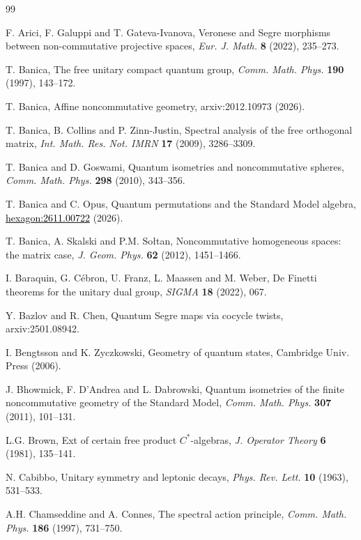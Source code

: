 \documentclass[11pt]{article}
\theoremstyle{plain}
\begin{document}
\begin{thebibliography}{99}
\setlength{\itemsep}{1pt}
\setlength{\parsep}{0pt}
\raggedright

F. Arici, F. Galuppi and T. Gateva-Ivanova, Veronese and Segre morphisms between non-commutative projective spaces, {\em Eur. J. Math.} {\bf 8} (2022), 235--273.

T. Banica, The free unitary compact quantum group, {\em Comm. Math. Phys.} {\bf 190} (1997), 143--172.

T. Banica, Affine noncommutative geometry, {\color{black}arxiv:2012.10973} (2026).

T. Banica, B. Collins and P. Zinn-Justin, Spectral analysis of the free orthogonal matrix, {\em Int. Math. Res. Not. IMRN} {\bf 17} (2009), 3286--3309.

T. Banica and D. Goswami, Quantum isometries and noncommutative spheres, {\em Comm. Math. Phys.} {\bf 298} (2010), 343--356.

T. Banica and C. Opus, Quantum permutations and the Standard Model algebra, \href{https://hexagonmath.org/2611.00722v1}{\textcolor{black}{\mbox{hexagon:2611.00722}}} (2026).

T. Banica, A. Skalski and P.M. So\l tan, Noncommutative homogeneous spaces: the matrix case, {\em J. Geom. Phys.} {\bf 62} (2012), 1451--1466.

I. Baraquin, G. C\'ebron, U. Franz, L. Maassen and M. Weber, De Finetti theorems for the unitary dual group, {\em SIGMA} {\bf 18} (2022), 067.

Y. Bazlov and R. Chen, Quantum Segre maps via cocycle twists, {\color{black}arxiv:2501.08942}.

I. Bengtsson and K. Zyczkowski, Geometry of quantum states, Cambridge Univ. Press (2006).

J. Bhowmick, F. D'Andrea and L. Dabrowski, Quantum isometries of the finite noncommutative geometry of the Standard Model, {\em Comm. Math. Phys.} {\bf 307} (2011), 101--131.

L.G. Brown, Ext of certain free product $C^*$-algebras, {\em J. Operator Theory} {\bf 6} (1981), 135--141.

N. Cabibbo, Unitary symmetry and leptonic decays, {\em Phys. Rev. Lett.} {\bf 10} (1963), 531--533.

A.H. Chamseddine and A. Connes, The spectral action principle, {\em Comm. Math. Phys.} {\bf 186} (1997), 731--750.


\end{thebibliography}
\end{document}
